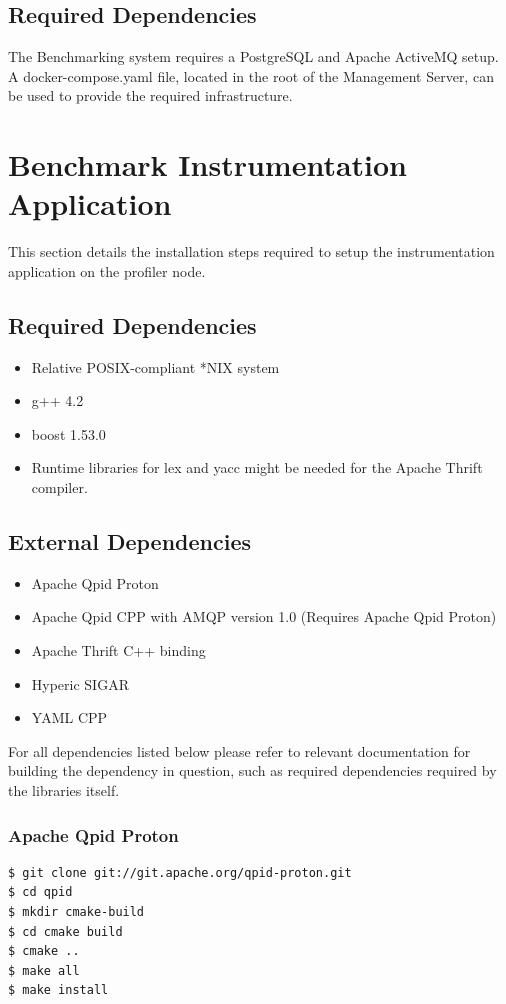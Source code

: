 \documentclass[11pt,a4paper]{article}
\begin{document}
\subsection{Required Dependencies}
The Benchmarking system requires a PostgreSQL and Apache ActiveMQ setup.
A docker-compose.yaml file, located in the root of the Management Server, can
be used to provide the required infrastructure.

\section{Benchmark Instrumentation Application}
This section details the installation steps required to setup the
instrumentation application on the profiler node.
\subsection{Required Dependencies}
\begin{itemize}
  \item Relative POSIX-compliant *NIX system
  \item g++ 4.2
  \item boost 1.53.0
  \item Runtime libraries for lex and yacc might be needed for the Apache Thrift compiler.
\end{itemize}

\subsection{External Dependencies}
\begin{itemize}
  \item Apache Qpid Proton
  \item Apache Qpid CPP with AMQP version 1.0 (Requires Apache Qpid Proton)
  \item Apache Thrift C++ binding
  \item Hyperic SIGAR
  \item YAML CPP
\end{itemize}

For all dependencies listed below please refer to relevant documentation for
building the dependency in question, such as required dependencies required by
the libraries itself.

\subsubsection{Apache Qpid Proton}
\begin{lstlisting}[language=bash]
$ git clone git://git.apache.org/qpid-proton.git
$ cd qpid
$ mkdir cmake-build
$ cd cmake build
$ cmake ..
$ make all
$ make install
\end{lstlisting}
\end{document}
